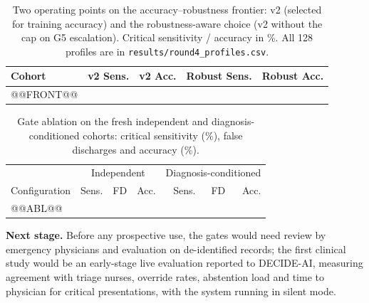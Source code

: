 \documentclass[11pt,a4paper]{article}%
\theoremstyle{plain}%
\theoremstyle{remark}%
\begin{document}
\begin{table}[h]
\caption{Two operating points on the accuracy--robustness frontier: v2 (selected for training accuracy) and the robustness-aware choice (v2 without the cap on G5 escalation). Critical sensitivity / accuracy in \%. All 128 profiles are in \texttt{results/round4\_profiles.csv}.}\label{tab:front}
\small
\begin{tabular}{@{}lrrrr@{}}
\toprule
Cohort & v2 Sens. & v2 Acc. & Robust Sens. & Robust Acc. \\
\midrule
@@FRONT@@
\bottomrule
\end{tabular}
\end{table}

\begin{table}[h]
\caption{Gate ablation on the fresh independent and diagnosis-conditioned cohorts: critical sensitivity (\%), false discharges and accuracy (\%).}\label{tab:abl}
\small
\begin{tabular}{@{}lrrrrrr@{}}
\toprule
 & \multicolumn{3}{c}{Independent} & \multicolumn{3}{c}{Diagnosis-conditioned} \\
Configuration & Sens. & FD & Acc. & Sens. & FD & Acc. \\
\midrule
@@ABL@@
\bottomrule
\end{tabular}
\end{table}

\textbf{Next stage.} Before any prospective use, the gates would need review by emergency physicians and evaluation on de-identified records; the first clinical study would be an early-stage live evaluation reported to DECIDE-AI, measuring agreement with triage nurses, override rates, abstention load and time to physician for critical presentations, with the system running in silent mode.
\end{document}

